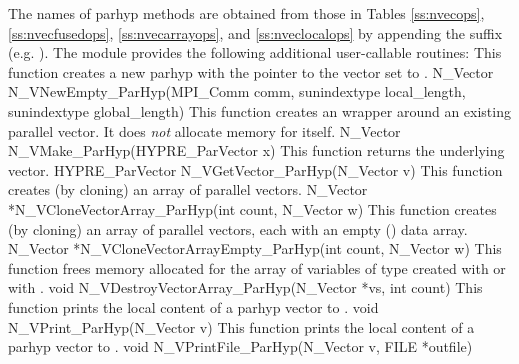 The names of parhyp methods are obtained from those in Tables \ref{ss:nvecops},
\ref{ss:nvecfusedops}, \ref{ss:nvecarrayops}, and \ref{ss:nveclocalops}
by appending the suffix  (e.g. ).
The module {\nvecph} provides the following additional user-callable routines:
{
  This function creates a new parhyp  with the pointer to the {\hypre} 
  vector set to .
}
{
  N\_Vector N\_VNewEmpty\_ParHyp(MPI\_Comm comm, sunindextype local\_length,
  sunindextype global\_length)
}
{  
  This function creates an  wrapper around an existing
  {\hypre} parallel vector. It does {\em not} allocate memory for  
  itself.  
}
{
  N\_Vector N\_VMake\_ParHyp(HYPRE\_ParVector x)
}
{  
  This function returns the underlying {\hypre} vector.
}
{
  HYPRE\_ParVector N\_VGetVector\_ParHyp(N\_Vector v)
}
{ 
  This function creates (by cloning) an array of  parallel vectors.
}
{
  N\_Vector *N\_VCloneVectorArray\_ParHyp(int count, N\_Vector w)
}
{
  This function creates (by cloning) an array of  parallel vectors,
  each with an empty () data array.
}
{
  N\_Vector *N\_VCloneVectorArrayEmpty\_ParHyp(int count, N\_Vector w)
}
{ 
  This function frees memory allocated for the array of   variables of
  type  created with  or with
  .
}
{
  void N\_VDestroyVectorArray\_ParHyp(N\_Vector *vs, int count)
}
{  
  This function prints the local content of a parhyp vector to .
}
{   
  void N\_VPrint\_ParHyp(N\_Vector v)
}
{  
  This function prints the local content of a parhyp vector to .
}
{   
  void N\_VPrintFile\_ParHyp(N\_Vector v, FILE *outfile)
}

